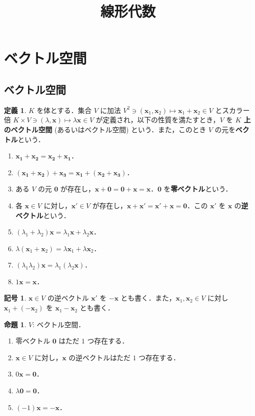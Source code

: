\documentclass{jlreq}
\title{線形代数}
\author{}
\theoremstyle{definition}
\newtheorem{dfn}[thm]{定義}
\newtheorem{sym}[thm]{記号}
\newtheorem{prop}[thm]{命題}
\begin{document}
  \maketitle
  \tableofcontents
  \newpage
  \section{ベクトル空間}
    \subsection{ベクトル空間}
      \begin{dfn}
        $K$ を体とする．集合 $V$ に加法 $V^2 \ni (\bm{x}_1,\bm{x}_2) \mapsto \bm{x}_1+\bm{x}_2 \in V$ とスカラー倍 $K \times V \ni (\lambda,\bm{x}) \mapsto \lambda\bm{x} \in V$ が定義され，以下の性質を満たすとき，$V$ を \textbf{$K$ 上のベクトル空間} (あるいはベクトル空間) という．また，このとき $V$ の元を\textbf{ベクトル}という．
        \begin{enumerate}
          \item $\bm{x_1}+\bm{x_2}=\bm{x_2}+\bm{x_1}$．
          \item $(\bm{x_1}+\bm{x_2})+\bm{x_3}=\bm{x_1}+(\bm{x_2}+\bm{x_3})$．
          \item ある $V$ の元 $\bm{0}$ が存在し，$\bm{x}+\bm{0}=\bm{0}+\bm{x}=\bm{x}$．$\bm{0}$ を\textbf{零ベクトル}という．
          \item 各 $\bm{x} \in V$ に対し，$\bm{x}' \in V$ が存在し，$\bm{x}+\bm{x}'=\bm{x}'+\bm{x}=\bm{0}$．この $\bm{x}'$ を $\bm{x}$ の\textbf{逆ベクトル}という．
          \item $(\lambda_1+\lambda_2)\bm{x}=\lambda_1\bm{x}+\lambda_2\bm{x}$．
          \item $\lambda(\bm{x}_1+\bm{x}_2)=\lambda\bm{x}_1+\lambda\bm{x}_2$．
          \item $(\lambda_1\lambda_2)\bm{x}=\lambda_1(\lambda_2\bm{x})$．
          \item $1\bm{x}=\bm{x}$．
        \end{enumerate}
      \end{dfn}
      \begin{sym}
        $\bm{x} \in V$ の逆ベクトル $\bm{x}'$ を $-\bm{x}$ とも書く．また，$\bm{x}_1,\bm{x}_2 \in V$ に対し $\bm{x}_1+(-\bm{x}_2)$ を $\bm{x}_1-\bm{x}_2$ とも書く．
      \end{sym}
      \begin{comment}
      \end{comment}
      \begin{prop}
        $V$: ベクトル空間．
        \begin{enumerate}
          \item 零ベクトル $\bm{0}$ はただ $1$ つ存在する．
          \item $\bm{x} \in V$ に対し，$\bm{x}$ の逆ベクトルはただ $1$ つ存在する．
          \item $0\bm{x}=\bm{0}$．
          \item $\lambda\bm{0}=\bm{0}$．
          \item $(-1)\bm{x}=-\bm{x}$．
        \end{enumerate}
      \end{prop}
\end{document}
